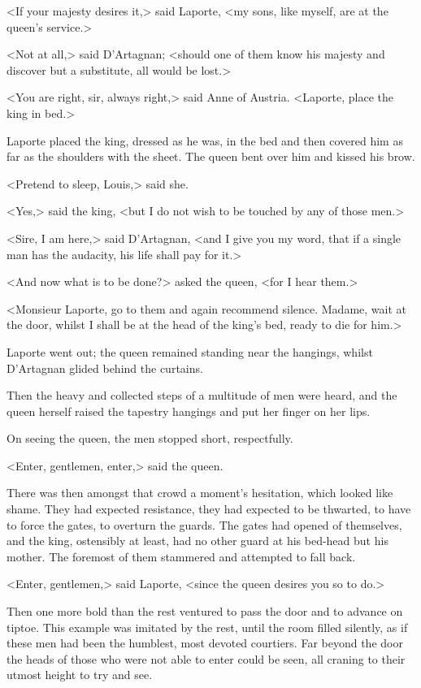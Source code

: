 <If your majesty desires it,> said Laporte, <my sons, like myself, are at the queen's service.>

<Not at all,> said D'Artagnan; <should one of them know his majesty and discover but a substitute, all would be lost.>

<You are right, sir, always right,> said Anne of Austria. <Laporte, place the king in bed.>

Laporte placed the king, dressed as he was, in the bed and then covered him as far as the shoulders with the sheet. The queen bent over him and kissed his brow.

<Pretend to sleep, Louis,> said she.

<Yes,> said the king, <but I do not wish to be touched by any of those men.>

<Sire, I am here,> said D'Artagnan, <and I give you my word, that if a single man has the audacity, his life shall pay for it.>

<And now what is to be done?> asked the queen, <for I hear them.>

<Monsieur Laporte, go to them and again recommend silence. Madame, wait at the door, whilst I shall be at the head of the king's bed, ready to die for him.>

Laporte went out; the queen remained standing near the hangings, whilst D'Artagnan glided behind the curtains.

Then the heavy and collected steps of a multitude of men were heard, and the queen herself raised the tapestry hangings and put her finger on her lips.

On seeing the queen, the men stopped short, respectfully.

<Enter, gentlemen, enter,> said the queen.

There was then amongst that crowd a moment's hesitation, which looked like shame. They had expected resistance, they had expected to be thwarted, to have to force the gates, to overturn the guards. The gates had opened of themselves, and the king, ostensibly at least, had no other guard at his bed-head but his mother. The foremost of them stammered and attempted to fall back.

<Enter, gentlemen,> said Laporte, <since the queen desires you so to do.>

Then one more bold than the rest ventured to pass the door and to advance on tiptoe. This example was imitated by the rest, until the room filled silently, as if these men had been the humblest, most devoted courtiers. Far beyond the door the heads of those who were not able to enter could be seen, all craning to their utmost height to try and see.


